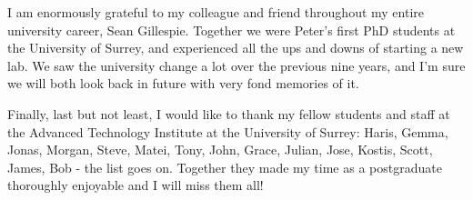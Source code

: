 \documentclass[../thesis/thesis.tex]{subfiles}
\begin{document}
I am enormously grateful to my colleague and friend throughout my entire university career, Sean Gillespie. Together we were Peter's first PhD students at the University of Surrey, and experienced all the ups and downs of starting a new lab. We saw the university change a lot over the previous nine years, and I'm sure we will both look back in future with very fond memories of it.

Finally, last but not least, I would like to thank my fellow students and staff at the Advanced Technology Institute at the University of Surrey: Haris, Gemma, Jonas, Morgan, Steve, Matei, Tony, John, Grace, Julian, Jose, Kostis, Scott, James, Bob - the list goes on. Together they made my time as a postgraduate thoroughly enjoyable and I will miss them all!

\newpage
\tableofcontents
{}

\newpage
{}
\listoffigures
\newpage
{}
\listoftables

\glsaddall
\printunsrtglossary[title=List of Abbreviations]

\end{document}
